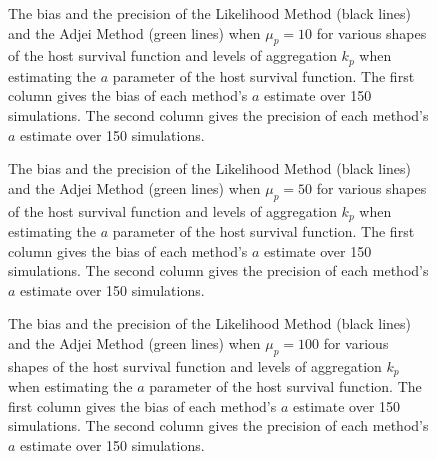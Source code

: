 \documentclass[12pt, a4paper]{article}
\begin{document}
\begin{figure}


    \captionsetup{justification=raggedright, singlelinecheck=false}

    \caption{\doublespacing The bias and the precision of the Likelihood Method (black lines) and the Adjei Method (green lines) when $\mu_p = 10$ for various shapes of the host survival function and levels of aggregation $k_p$ when estimating the $a$ parameter of the host survival function.  The first column gives the bias of each method's $a$ estimate over 150 simulations. The second column gives the precision of each method's $a$ estimate over 150 simulations.}

    \label{fig:biasa_10}

\end{figure}

\begin{figure}


    \captionsetup{justification=raggedright, singlelinecheck=false}

    \caption{\doublespacing The bias and the precision of the Likelihood Method (black lines) and the Adjei Method (green lines) when $\mu_p = 50$ for various shapes of the host survival function and levels of aggregation $k_p$ when estimating the $a$ parameter of the host survival function.  The first column gives the bias of each method's $a$ estimate over 150 simulations. The second column gives the precision of each method's $a$ estimate over 150 simulations.}

    \label{fig:biasa_50}

\end{figure}

\begin{figure}


    \captionsetup{justification=raggedright, singlelinecheck=false}

    \caption{\doublespacing The bias and the precision of the Likelihood Method (black lines) and the Adjei Method (green lines) when $\mu_p = 100$ for various shapes of the host survival function and levels of aggregation $k_p$ when estimating the $a$ parameter of the host survival function.  The first column gives the bias of each method's $a$ estimate over 150 simulations. The second column gives the precision of each method's $a$ estimate over 150 simulations.}

    \label{fig:biasa_100}

\end{figure}
\end{document}
